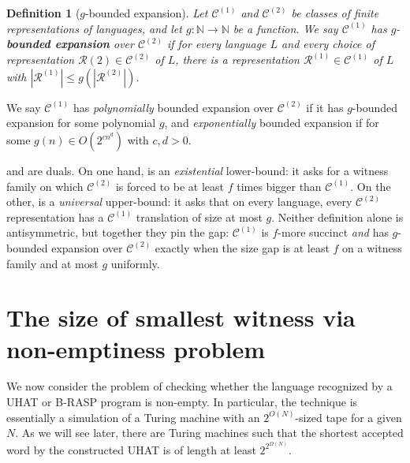 \documentclass{article} %
\newtheorem{definition}[theorem]{Definition}
\newcommand{\N}{\mathbb{N}}
\newcommand{\defn}[1]{\textbf{#1}}
\newcommand{\Lang}{L}
\newcommand{\classC}{\mathcal{C}}
\newcommand{\rep}{\mathcal{R}}
\begin{document}
\begin{definition}[$g$-bounded expansion]\label{def:expansive}
Let $\classC^{(1)}$ and $\classC^{(2)}$ be classes of finite representations of languages, and let $g \colon \N \to \N$ be a function. 
We say $\classC^{(1)}$ has $g$-\defn{bounded expansion} over $\classC^{(2)}$ if for every language $\Lang$ and every choice of representation $\rep{(2)} \in \classC^{(2)}$ of $\Lang$, there is a representation $\rep^{(1)} \in \classC^{(1)}$ of $\Lang$ with $|\rep^{(1)}| \le g(|\rep^{(2)}|)$. 
\end{definition}
We say $\classC^{(1)}$ has \emph{polynomially} bounded expansion over $\classC^{(2)}$ if it has $g$-bounded expansion for some polynomial $g$, and \emph{exponentially} bounded expansion if for some $g(n) \in O(2^{c n^d})$ with $c,d > 0$.

 and  are duals. 
On one hand,  is an \emph{existential} lower-bound: it asks for a witness family on which $\classC^{(2)}$ is forced to be at least $f$ times bigger than $\classC^{(1)}$. 
On the other,  is a \emph{universal} upper-bound: it asks that on every language, every $\classC^{(2)}$ representation has a $\classC^{(1)}$ translation of size at most $g$. 
Neither definition alone is antisymmetric, but together they pin the gap: $\classC^{(1)}$ is $f$-more succinct \emph{and} has $g$-bounded expansion over $\classC^{(2)}$ exactly when the size gap is at least $f$ on a witness family and at most $g$ uniformly. 

\section{The size of smallest witness via non-emptiness problem}
\label{sec:emptiness}
We now consider the problem of checking whether the language
recognized by a UHAT or B-RASP program is non-empty. In particular, the
technique is essentially a simulation of a Turing machine with an
$2^{O(N)}$-sized tape for a given $N$. 
As we will see later,
there are Turing machines such that
the shortest accepted word
by the constructed UHAT
is of length at least $2^{2^{\Omega(N)}}$.
\end{document}
